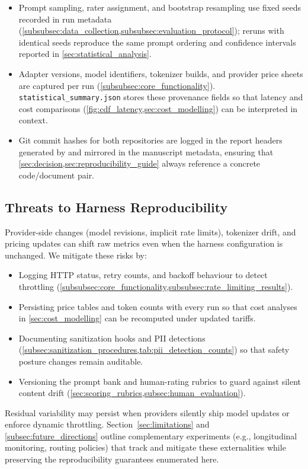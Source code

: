 \begin{itemize}
	\item Prompt sampling, rater assignment, and bootstrap resampling use fixed seeds recorded in run metadata (\cref{subsubsec:data_collection,subsubsec:evaluation_protocol}); reruns with identical seeds reproduce the same prompt ordering and confidence intervals reported in \cref{sec:statistical_analysis}.
	\item Adapter versions, model identifiers, tokenizer builds, and provider price sheets are captured per run (\cref{subsubsec:core_functionality}). \texttt{statistical\_summary.json} stores these provenance fields so that latency and cost comparisons (\cref{fig:cdf_latency,sec:cost_modelling}) can be interpreted in context.
	\item Git commit hashes for both repositories are logged in the report headers generated by  and mirrored in the manuscript metadata, ensuring that \cref{sec:decision,sec:reproducibility_guide} always reference a concrete code/document pair.
\end{itemize}

\subsection{Threats to Harness Reproducibility}
\label{subsec:repro_threats}

Provider-side changes (model revisions, implicit rate limits), tokenizer drift, and pricing updates can shift raw metrics even when the harness configuration is unchanged. We mitigate these risks by:
\begin{itemize}
	\item Logging HTTP status, retry counts, and backoff behaviour to detect throttling (\cref{subsubsec:core_functionality,subsubsec:rate_limiting_results}).
	\item Persisting price tables and token counts with every run so that cost analyses in \cref{sec:cost_modelling} can be recomputed under updated tariffs.
	\item Documenting sanitization hooks and PII detections (\cref{subsec:sanitization_procedures,tab:pii_detection_counts}) so that safety posture changes remain auditable.
	\item Versioning the prompt bank and human-rating rubrics to guard against silent content drift (\cref{sec:scoring_rubrics,subsec:human_evaluation}).
\end{itemize}

Residual variability may persist when providers silently ship model updates or enforce dynamic throttling. Section~\ref{sec:limitations} and \cref{subsec:future_directions} outline complementary experiments (e.g., longitudinal monitoring, routing policies) that track and mitigate these externalities while preserving the reproducibility guarantees enumerated here.
